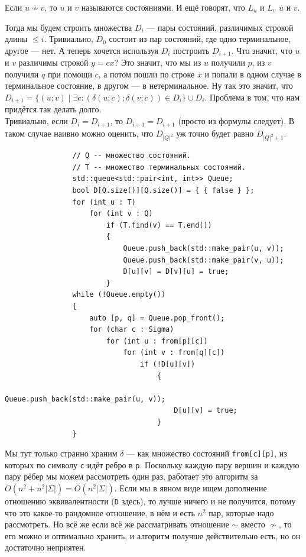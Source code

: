 \documentclass{article}
\begin{document}
\begin{itemize}
        \dfn Если $u\nsim v$, то $u$ и $v$ называются  состояниями. И ещё говорят, что $L_u$ и $L_v$  $u$ и $v$.
        \begin{Comment}
            Тогда мы будем строить множества $D_i$ --- пары состояний, различимых строкой длины $\leqslant i$. Тривиально, $D_0$ состоит из пар состояний, где одно терминальное, другое --- нет. А теперь хочется используя $D_i$ построить $D_{i+1}$. Что значит, что $u$ и $v$ различимы строкой $y=cx$? Это значит, что мы из $u$ получили $p$, из $v$ получили $q$ при помощи $c$, а потом пошли по строке $x$ и попали в одном случае в терминальное состояние, в другом --- в нетерминальное. Ну так это значит, что $D_{i+1}=\{(u;v)\mid \exists c:(\delta(u;c);\delta(v;c))\in D_i\}\cup D_i$. Проблема в том, что нам придётся так делать долго.\\
            Тривиально, если $D_i=D_{i+1}$, то $D_{i+1}=D_{i+1}$ (просто из формулы следует). В таком случае наивно можно оценить, что $D_{|Q|^2}$ уж точно будет равно $D_{|Q|^2+1}$.\\
            \begin{verbatim}
                // Q -- множество состояний.
                // T -- множество терминальных состояний.
                std::queue<std::pair<int, int>> Queue;
                bool D[Q.size()][Q.size()] = { { false } };
                for (int u : T)
                    for (int v : Q)
                        if (T.find(v) == T.end())
                        {
                            Queue.push_back(std::make_pair(u, v));
                            Queue.push_back(std::make_pair(v, u));
                            D[u][v] = D[v][u] = true;
                        }
                while (!Queue.empty())
                {
                    auto [p, q] = Queue.pop_front();
                    for (char c : Sigma)
                        for (int u : from[p][c])
                            for (int v : from[q][c])
                                if (!D[u][v])
                                    {
                                        Queue.push_back(std::make_pair(u, v));
                                        D[u][v] = true;
                                    }
                }
            \end{verbatim}
            Мы тут только странно храним $\delta$ --- как множество состояний \texttt{from[c][p]}, из которых по символу \texttt{c} идёт ребро в \texttt{p}. Поскольку каждую пару вершин и каждую пару рёбер мы можем рассмотреть один раз, работает это алгоритм за $O(n^2+n^2|\Sigma|)=O(n^2|\Sigma|)$. Если мы в явном виде ищем дополнение отношению эквивалентности (\texttt{D} здесь), то лучше ничего и не получится, потому что это какое-то рандомное отношение, в нём и есть $n^2$ пар, которые надо рассмотреть. Но всё же если всё же рассматривать отношение $\sim$ вместо $\nsim$, то его можно и оптимально хранить, и алгоритм получше действительно есть, но он достаточно неприятен.
        \end{Comment}
    \end{itemize}
\end{document}
